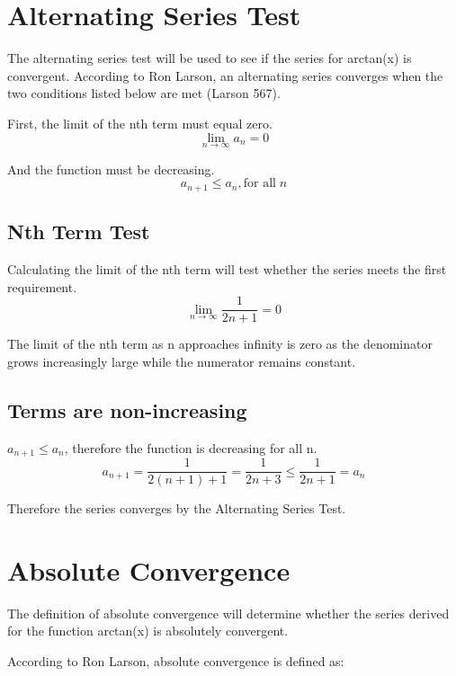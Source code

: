 \documentclass[12pt, titlepage]{article}
\begin{document}
\section{Alternating Series Test}
The alternating series test will be used to see if the series for arctan(x) is convergent. According to Ron Larson, an alternating series converges when the two conditions listed below are met (Larson 567).

First, the limit of the nth term must equal zero.
\begin{equation}
    \lim_{n \to \infty} a_{n} = 0
\end{equation}

And the function must be decreasing.
\begin{equation}
    a_{n+1} \leq a_{n}, \textrm{for all} \; n
\end{equation}

\subsection{Nth Term Test}
Calculating the limit of the nth term will test whether the series meets the first requirement.
\begin{equation}
    \lim_{n \to \infty} \frac{1}{2n+1} = 0     
\end{equation}

The limit of the nth term as n approaches infinity is zero as the denominator grows increasingly large while the numerator remains constant.

\subsection{Terms are non-increasing}
\(a_{n+1} \leq a_{n}\), therefore the function is decreasing for all n. 
\begin{equation}
    a_{n+1} = \frac{1}{2(n+1) + 1} = \frac{1}{2n+3} \leq \frac{1}{2n+1} = a_{n}
\end{equation}

Therefore the series converges by the Alternating Series Test.

\section{Absolute Convergence}
The definition of absolute convergence will determine whether the series derived for the function arctan(x) is absolutely convergent.

According to Ron Larson, absolute convergence is defined as: 
\end{document}
